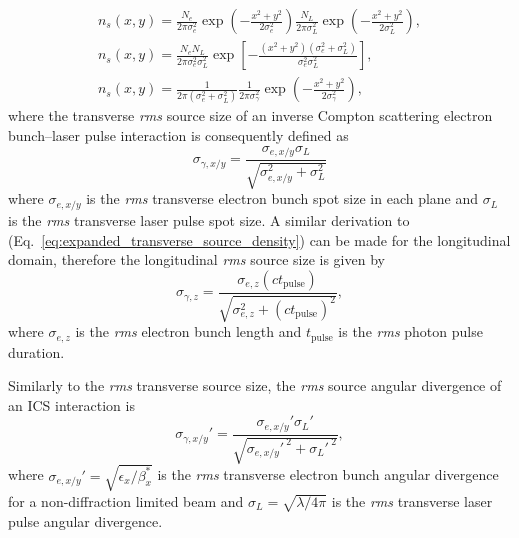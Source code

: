 \documentclass[../main.tex]{subfiles}
\begin{document}
\begin{align}
n_{s}\left(x,y\right) = \frac{N_{e}}{2\pi\sigma_{e}^{2}}\exp\left(-\frac{x^{2}+y^{2}}{2\sigma_{e}^{2}}\right)\frac{N_{L}}{2\pi\sigma_{L}^{2}}\exp\left(-\frac{x^{2}+y^{2}}{2\sigma_{L}^{2}}\right), \nonumber \\
n_{s}\left(x,y\right) = \frac{N_{e}N_{L}}{2\pi\sigma_{e}^{2}\sigma_{L}^{2}}\exp\left[-\frac{\left(x^{2}+y^{2}\right)\left(\sigma_{e}^{2}+\sigma_{L}^{2}\right)}{\sigma_{e}^{2}\sigma_{L}^{2}}\right], \nonumber \\
n_{s}\left(x,y\right) = \frac{1}{2\pi\left(\sigma_{e}^{2}+\sigma_{L}^{2}\right)}\frac{1}{2\pi\sigma_{\gamma}^{2}}\exp\left(-\frac{x^{2}+y^{2}}{2\sigma_{\gamma}^{2}}\right),
\label{eq:expanded_transverse_source_density}    
\end{align}
where the transverse \textit{rms} source size of an inverse Compton scattering electron bunch--laser pulse interaction is consequently defined as
\begin{equation}
\sigma_{\gamma,x/y} = \frac{\sigma_{e,x/y}\sigma_{L}}{\sqrt{\sigma_{e,x/y}^{2}+\sigma_{L}^{2}}}
\label{eq:source_size}
\end{equation}
where $\sigma_{e,x/y}$ is the \textit{rms} transverse electron bunch spot size in each plane and $\sigma_{L}$ is the \textit{rms} transverse laser pulse spot size. A similar derivation to (Eq.~\ref{eq:expanded_transverse_source_density}) can be made for the longitudinal domain, therefore the longitudinal \textit{rms} source size is given by
\begin{equation}
\sigma_{\gamma,z} = \frac{\sigma_{e,z}\left(ct_{\mathrm{pulse}}\right)}{\sqrt{\sigma_{e,z}^{2}+\left(ct_{\mathrm{pulse}}\right)^{2}}},
\label{eq:longitudinal_source_size}
\end{equation}
where $\sigma_{e,z}$ is the \textit{rms} electron bunch length and $t_{\mathrm{pulse}}$ is the \textit{rms} photon pulse duration. 

Similarly to the \textit{rms} transverse source size, the \textit{rms} source angular divergence of an ICS interaction is
\begin{equation}
\sigma_{\gamma,x/y}' = \frac{\sigma_{e,x/y}'\sigma_{L}'}{\sqrt{\sigma_{e,x/y}'^{~2}+\sigma_{L}'^{~2}}},
\label{eq:source_divergence}
\end{equation}
where $\sigma_{e,x/y}' = \sqrt{\epsilon_{x}/\beta_{x}^{*}}$ is the \textit{rms} transverse electron bunch angular divergence for a non-diffraction limited beam and $\sigma_{L} = \sqrt{\lambda/4\pi}$ is the \textit{rms} transverse laser pulse angular divergence.
\end{document}
